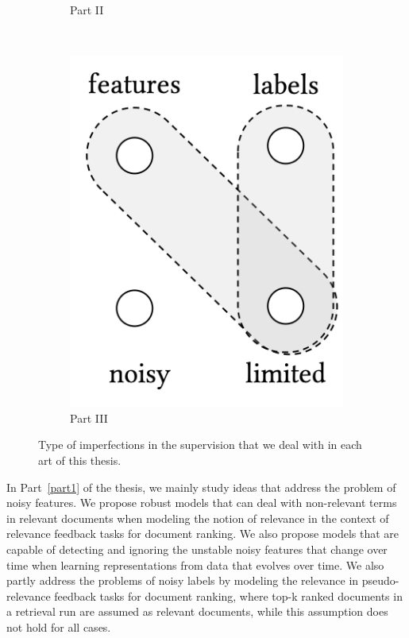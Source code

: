 \begin{figure}[t]
\begin{subfigure}[b]{0.32\textwidth}
        \caption{\label{fig:p1}Part II}
    \end{subfigure}
        ~ 
    \begin{subfigure}[b]{0.32\textwidth}
    \centering
        \includegraphics[width=0.55\linewidth]{01-introduction/figs_and_tables/fig_p3.png}
        \caption{\label{fig:p1}Part III}
    \end{subfigure}
\caption{\label{fig:thesis_parts}Type of imperfections in the supervision that we deal with in each art of this thesis.}
\end{figure}

In Part~\ref{part1} of the thesis, we mainly study ideas that address the problem of noisy features. We propose robust models that can deal with non-relevant terms in relevant documents when modeling the notion of relevance in the context of relevance feedback tasks for document ranking. We also propose models that are capable of detecting and ignoring the unstable noisy features that change over time when learning representations from data that evolves over time. We also partly address the problems of noisy labels by modeling the relevance in pseudo-relevance feedback tasks for document ranking, where top-k ranked documents in a retrieval run are assumed as relevant documents, while this assumption does not hold for all cases.


